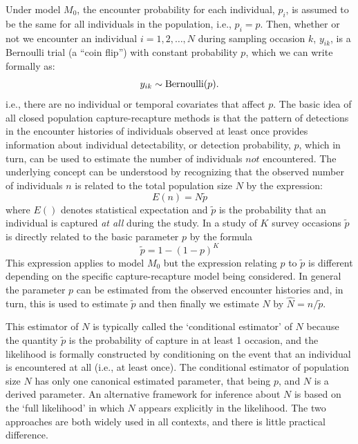 \documentclass{book}
\begin{document}
Under model $M_0$, the encounter probability for each individual,
$p_i$, is assumed to be the same for all individuals in the
population, i.e., $p_i = p$. Then, whether or not we encounter an
individual $i=1,2,\ldots,N$ during sampling occasion $k$, $y_{ik}$, is
a Bernoulli trial (a ``coin flip'') with constant probability $p$,
which we can write formally as:
\[
y_{ik} \sim \hbox{Bernoulli}(p).
\]
i.e., there are no individual or temporal covariates that affect
$p$. The basic idea of all closed population capture-recapture methods
is that the pattern of detections in the encounter histories of
individuals observed at least once provides information about
individual detectability, or detection probability, $p$, which in
turn, can be used to estimate the number of individuals $not$
encountered.  The underlying concept can be understood by recognizing
that the observed number of individuals $n$ is related to the total
population size $N$ by the expression:
\[
 E(n) = N\tilde{p}
\]
where $E()$ denotes statistical expectation and $\tilde{p}$ is the
probability that an individual is captured {\it at all} during the
study. In a study of $K$ survey occasions $\tilde{p}$ is directly
related to the basic parameter $p$ by the formula
\[
 \tilde{p} = 1-(1-p)^K
\]
This expression applies to model $M_0$ but the
 expression relating $p$ to $\tilde{p}$ is different depending on
the specific  capture-recapture model being considered.
In general the parameter $p$ can be estimated from the observed
encounter histories and, in turn, this is used to estimate $\tilde{p}$
and then finally we estimate $N$ by $\hat{N} = n/\tilde{p}$.

This estimator of $N$ is typically called the `conditional estimator' of $N$
because the quantity $\tilde{p}$ is the probability of capture in at
least 1 occasion, and the likelihood is formally constructed by
conditioning on the event that an individual is encountered at all
(i.e., at least once).  The conditional estimator of population size
$N$ has only one canonical estimated parameter, that being $p$, and
$N$ is a derived parameter. An alternative framework for inference
about $N$ is based on the `full likelihood' in which $N$ appears
explicitly in the likelihood.  The two approaches are both widely used
in all contexts, and there is little practical difference.

\end{document}
